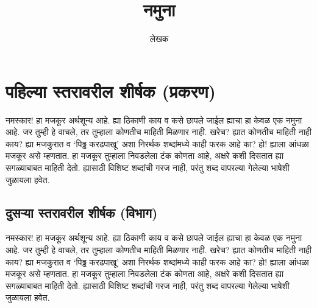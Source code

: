 %
%
\title{नमुना}
\author{लेखक}

\maketitle

\tableofcontents

\chapter{पहिल्या स्तरावरील शीर्षक (प्रकरण)}

नमस्कार! हा मजकूर अर्थशून्य आहे. ह्या ठिकाणी काय व कसे छापले जाईल ह्याचा हा केवळ एक नमुना
आहे. जर तुम्ही हे वाचले, तर तुम्हाला कोणतीच माहिती मिळणार नाही. खरेच? ह्यात कोणतीच माहिती
नाही काय? ह्या मजकुरात व `पिढ्ढ करढपाखू' अशा निरर्थक शब्दांमध्ये काही फरक आहे का? हो!
ह्याला आंधळा मजकूर असे म्हणतात. हा मजकूर तुम्हाला निवडलेला टंक कोणता आहे, अक्षरे कशी दिसतात
ह्या सगळ्याबाबत माहिती देतो. ह्यासाठी विशिष्ट शब्दांची गरज नाही, परंतु शब्द वापरल्या गेलेल्या
भाषेशी जुळायला हवेत.

\section{दुसऱ्या स्तरावरील शीर्षक (विभाग)}

नमस्कार! हा मजकूर अर्थशून्य आहे. ह्या ठिकाणी काय व कसे छापले जाईल ह्याचा हा केवळ एक नमुना
आहे. जर तुम्ही हे वाचले, तर तुम्हाला कोणतीच माहिती मिळणार नाही. खरेच? ह्यात कोणतीच माहिती
नाही काय? ह्या मजकुरात व `पिढ्ढ करढपाखू' अशा निरर्थक शब्दांमध्ये काही फरक आहे का? हो!
ह्याला आंधळा मजकूर असे म्हणतात. हा मजकूर तुम्हाला निवडलेला टंक कोणता आहे, अक्षरे कशी दिसतात
ह्या सगळ्याबाबत माहिती देतो. ह्यासाठी विशिष्ट शब्दांची गरज नाही, परंतु शब्द वापरल्या गेलेल्या
भाषेशी जुळायला हवेत.

